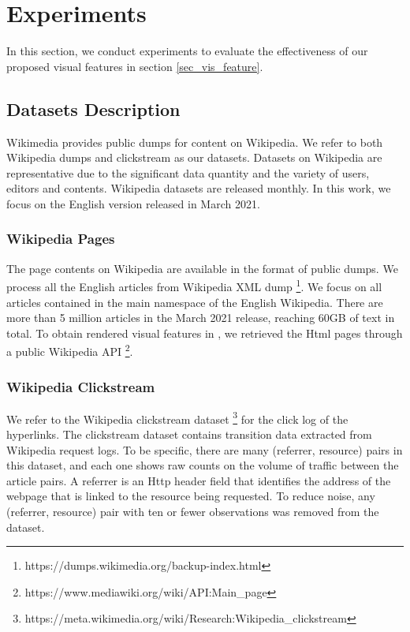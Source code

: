 \section{Experiments}

In this section, we conduct experiments to evaluate the effectiveness of our proposed visual features in section \ref{sec_vis_feature}.

\subsection{Datasets Description}

Wikimedia provides public dumps for content on Wikipedia. We refer to both Wikipedia dumps and clickstream as our datasets. Datasets on Wikipedia are representative due to the significant data quantity and the variety of users, editors and contents. Wikipedia datasets are released monthly. In this work, we focus on the English version released in March 2021.

\subsubsection {Wikipedia Pages}

The page contents on Wikipedia are available in the format of public dumps. We process all the English articles from Wikipedia XML dump \footnote{https://dumps.wikimedia.org/backup-index.html}. We focus on all articles contained in the main namespace of the English Wikipedia. There are more than 5 million articles in the March 2021 release, reaching 60GB of text in total. To obtain rendered visual features in \cite{dimitrov2017makes}, we retrieved the Html pages through a public Wikipedia API \footnote{https://www.mediawiki.org/wiki/API:Main\_page}.

\subsubsection{Wikipedia Clickstream}

We refer to the Wikipedia clickstream dataset \footnote{https://meta.wikimedia.org/wiki/Research:Wikipedia\_clickstream} for the click log of the hyperlinks. The clickstream dataset contains transition data extracted from Wikipedia request logs. To be specific, there are many (referrer, resource) pairs in this dataset, and each one shows raw counts on the volume of traffic between the article pairs. A referrer is an Http header field that identifies the address of the webpage that is linked to the resource being requested. To reduce noise, any (referrer, resource) pair with ten or fewer observations was removed from the dataset.

